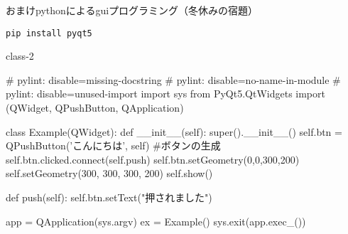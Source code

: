 \documentclass[11pt,a4paper,dvipdfmx,titlepage]{jsreport}
\begin{document}
おまけpythonによるguiプログラミング（冬休みの宿題）

\newpage

\begin{verbatim}
pip install pyqt5
\end{verbatim}

\begin{pabox}{class-2}
\begin{listing}{1}
# pylint: disable=missing-docstring
# pylint: disable=no-name-in-module
# pylint: disable=unused-import
import sys
from PyQt5.QtWidgets import (QWidget, QPushButton, QApplication)

class Example(QWidget):
    def __init__(self):
        super().__init__()
        self.btn = QPushButton('こんにちは', self) #ボタンの生成
        self.btn.clicked.connect(self.push)  
        self.btn.setGeometry(0,0,300,200)
        self.setGeometry(300, 300, 300, 200)
        self.show()

    def push(self):
        self.btn.setText("押されました")

app = QApplication(sys.argv)
ex = Example()
sys.exit(app.exec_())
\end{listing}
\end{pabox}
\end{document}
